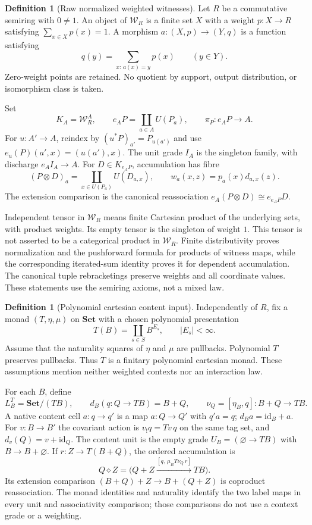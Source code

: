 \documentclass[11pt,a4paper]{article}
\theoremstyle{definition}
\newtheorem{definition}[theorem]{Definition}
\newcommand{\Set}{\mathbf{Set}}
\newcommand{\W}{\mathcal W_R}
\newcommand{\id}{\mathrm{id}}
\begin{document}
\begin{definition}[Raw normalized weighted witnesses]
Let $R$ be a commutative semiring with $0\ne1$. An object of $\W$ is a finite
set $X$ with a weight $p:X\to R$ satisfying $\sum_{x\in X}p(x)=1$. A morphism
$a:(X,p)\to(Y,q)$ is a function satisfying
\[
 q(y)=\sum_{x:\,a(x)=y}p(x)\qquad(y\in Y).
\]
Zero-weight points are retained. No quotient by support, output distribution,
or isomorphism class is taken.
\end{definition}

Set
\[
 K_A=\W^A,\qquad e_AP=\coprod_{a\in A}U(P_a),\qquad
 \pi_P:e_AP\longrightarrow A.
\]
For $u:A'\to A$, reindex by $(u^*P)_{a'}=P_{u(a')}$ and use
$e_u(P)(a',x)=(u(a'),x)$. The unit grade $I_A$ is the singleton family, with
discharge $e_AI_A\to A$. For $D\in K_{e_AP}$, accumulation has fibre
\[
 (P\otimes D)_a=\coprod_{x\in U(P_a)}U(D_{a,x}),
 \qquad w_a(x,z)=p_a(x)d_{a,x}(z).
\]
The extension comparison is the canonical reassociation
$e_A(P\otimes D)\cong e_{e_AP}D$.

Independent tensor in $\W$ means finite Cartesian product of the underlying
sets, with product weights. Its empty tensor is the singleton of weight $1$.
This tensor is not asserted to be a categorical product in $\W$. Finite
distributivity proves normalization and the pushforward formula for products
of witness maps, while the corresponding iterated-sum identity proves it for
dependent accumulation. The canonical tuple rebracketings preserve weights
and all coordinate values. These statements use the semiring axioms, not a
mixed law.

\begin{definition}[Polynomial cartesian content input]
Independently of $R$, fix a monad $(T,\eta,\mu)$ on $\Set$ with a chosen
polynomial presentation
\[
 T(B)=\coprod_{s\in S}B^{E_s},\qquad |E_s|<\infty.
\]
Assume that the naturality squares of $\eta$ and $\mu$ are pullbacks.
Polynomial $T$ preserves pullbacks. Thus $T$ is a finitary polynomial
cartesian monad. These assumptions mention neither weighted contexts nor
an interaction law.
\end{definition}

For each $B$, define
\[
 L^T_B=\Set/(TB),\qquad d_B(q:Q\to TB)=B+Q,
 \qquad \nu_Q=[\eta_B,q]:B+Q\longrightarrow TB.
\]
A native content cell $a:q\to q'$ is a map $a:Q\to Q'$ with $q'a=q$;
$d_Ba=\id_B+a$. For $v:B\to B'$ the covariant action is
$v_!q=Tv\,q$ on the same tag set, and $d_v(Q)=v+\id_Q$.
The content unit is the empty grade $U_B=(\varnothing\to TB)$ with
$B\to B+\varnothing$. If $r:Z\to T(B+Q)$, the ordered accumulation is
\[
 Q\diamond Z=
 \bigl(Q+Z\xrightarrow{[q,\,\mu_BT\nu_Q\,r]}TB\bigr).
\]
Its extension comparison $(B+Q)+Z\to B+(Q+Z)$ is coproduct reassociation.
The monad identities and naturality identify the two label maps in every
unit and associativity comparison; those comparisons do not use a context
grade or a weighting.
\end{document}

